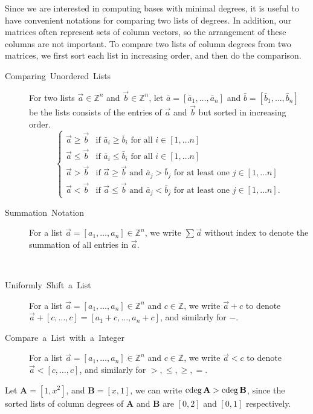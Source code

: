 Since we are interested in computing bases with minimal degrees, it
is useful to have convenient notations for comparing two lists of
degrees.   In addition, our matrices often represent sets of column
vectors, so the arrangement of these columns are not important. To
compare two lists of column degrees from two matrices, we first sort
each list in increasing order, and then do the comparison.
\begin{description}
\item [{Comparing~Unordered~Lists}] For two lists $\vec{a}\in\mathbb{Z}^{n}$
and $\vec{b}\in\mathbb{Z}^{n}$, let $\bar{a}=\left[\bar{a}_{1},\dots,\bar{a}_{n}\right]$
and $\bar{b}=\left[\bar{b}_{1},\dots,\bar{b}_{n}\right]$ be the lists
consists of the entries of $\vec{a}$ and $\vec{b}$ but sorted in
increasing order. 
\[
\begin{cases}
\vec{a}\ge\vec{b} & \mbox{if }\bar{a}_{i}\ge\bar{b}_{i}\mbox{ for all }i\in\left[1,\dots n\right]\\
\vec{a}\le\vec{b} & \mbox{if }\bar{a}_{i}\le\bar{b}_{i}\mbox{ for all }i\in\left[1,\dots n\right]\\
\vec{a}>\vec{b} & \mbox{if }\vec{a}\ge\vec{b}\mbox{ and }\bar{a}_{j}>\bar{b}_{j}\mbox{ for at least one }j\in\left[1,\dots n\right]\\
\vec{a}<\vec{b} & \mbox{if }\vec{a}\le\vec{b}\mbox{ and }\bar{a}_{j}<\bar{b}_{j}\mbox{ for at least one }j\in\left[1,\dots n\right].
\end{cases}
\]

\item [{Summation~Notation}] For a list $\vec{a}=\left[a_{1},\dots,a_{n}\right]\in\mathbb{Z}^{n}$,
we write $\sum\vec{a}$ without index to denote the summation of all
entries in $\vec{a}$. 
\item [{}]~
\item [{Uniformly~Shift~a~List}] For a list $\vec{a}=\left[a_{1},\dots,a_{n}\right]\in\mathbb{Z}^{n}$
and $c\in\mathbb{Z}$, we write $\vec{a}+c$ to denote $\vec{a}+\left[c,\dots,c\right]=\left[a_{1}+c,\dots,a_{n}+c\right]$,
and similarly for $-$.
\item [{Compare~a~List~with~a~Integer}] For a list $\vec{a}=\left[a_{1},\dots,a_{n}\right]\in\mathbb{Z}^{n}$
and $c\in\mathbb{Z}$, we write $\vec{a}<c$ to denote $\vec{a}<\left[c,\dots,c\right]$,
and similarly for $>,\le,\ge,=$.\end{description}
\begin{example}
Let $\mathbf{A}=\left[1,x^{2}\right]$, and $\mathbf{B}=\left[x,1\right]$,
we can write $\cdeg\mathbf{A}>\cdeg\mathbf{B}$, since the sorted
lists of column degrees of $\mathbf{A}$ and $\mathbf{B}$ are $\left[0,2\right]$
and $\left[0,1\right]$ respectively.
\end{example}

